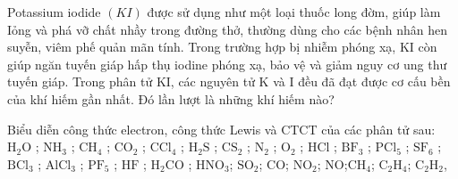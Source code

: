 	\begin{bt}
		Potassium iodide $(KI)$ được sử dụng như một loại thuốc long đờm, giúp làm Iỏng và phá vỡ chất nhầy trong đường thở, thường dùng cho các bệnh nhân hen suyễn, viêm phế quản mãn tính. Trong trường hợp bị nhiễm phóng xạ, KI còn giúp ngăn tuyến giáp hấp thụ iodine phóng xạ, bảo vệ và giảm nguy cơ ung thư tuyến giáp. Trong phân tử KI, các nguyên tử K và I đều đã đạt được cơ cấu bền của khí hiếm gần nhất. Đó lần lượt là những khí hiếm nào?
	\end{bt}
	\begin{bt}
		Biểu diễn công thức electron, công thức Lewis và CTCT của các phân tử sau:
		$\text{H}_2\text{O}$ ; $\text{NH}_3$ ; $\text{CH}_4$ ; $\text{CO}_2$ ; $\text{CCl}_4$ ; $\text{H}_2\text{S}$ ; $\text{CS}_2$ ; $\text{N}_2$ ; $\text{O}_2$ ; $\text{HCl}$ ; $\text{BF}_3$ ; $\text{PCl}_5$ ; $\text{SF}_6$ ; $\text{BCl}_3$ ; $\text{AlCl}_3$ ; $\text{PF}_5$ ; $\text{HF}$ ; $\text{H}_2\text{CO}$ ; $\text{HNO}_3$; $\text{SO}_2$; $\text{CO}$; $\text{NO}_2$; $\text{NO}$;$\text{CH}_4$; $\text{C}_2\text{H}_4$; $\text{C}_2\text{H}_2$,
		\loigiai{}
	\end{bt}

